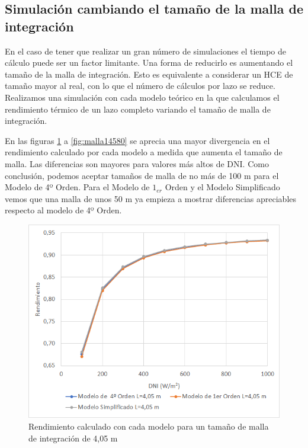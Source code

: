 \subsection{Simulación cambiando el tamaño de la malla de integración}
\label{mallaintegracion}

En el caso de tener que realizar un gran número de simulaciones el tiempo de cálculo puede ser un factor limitante. Una forma de reducirlo es aumentando el tamaño de la malla de integración. Esto es equivalente a considerar un HCE de tamaño mayor al real, con lo que el número de cálculos por lazo se reduce. Realizamos una simulación con cada modelo teórico en la que calculamos el rendimiento térmico de un lazo completo variando el tamaño de malla de integración.  

En las figuras  \ref{fig:malla0405} a \ref{fig:malla14580} se aprecia una mayor divergencia en el rendimiento calculado por cada modelo a medida que aumenta el tamaño de malla. Las diferencias son mayores para valores más altos de DNI. Como conclusión, podemos aceptar tamaños de malla de no más de 100 m para el Modelo de 4º Orden. Para el Modelo de $1_{er}$ Orden y el Modelo Simplificado vemos que una malla de unos 50 m ya empieza a mostrar diferencias apreciables respecto al modelo de 4º Orden.

\begin{figure}[H]
\includegraphics[width=0.9\linewidth]{images/malla0405.png}
\caption{Rendimiento calculado con cada modelo para un tamaño de malla de integración de 4,05 m} 
\label{fig:malla0405}
\end{figure}

